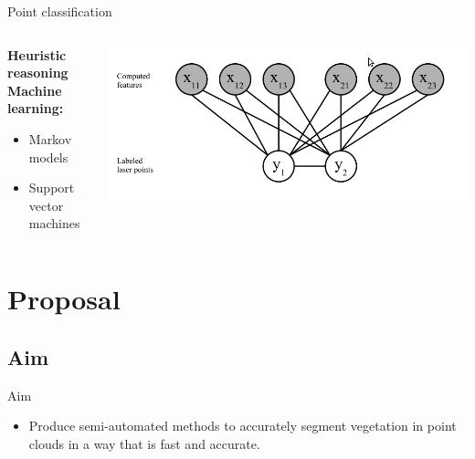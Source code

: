 \documentclass{beamer}
\begin{document}
\begin{frame}{Point classification}

\begin{columns}[T]
\begin{column}{0.5\textwidth}

\textbf{Heuristic reasoning}\\
\textbf{Machine learning:}
\begin{itemize}
\item Markov models
\item Support vector machines
\end{itemize}


\end{column}

\begin{column}{0.5\textwidth}
\includegraphics[width=1\textwidth]{pics/crf.png}

\end{column}

\end{columns}

\end{frame}

\section{Proposal}

\subsection{Aim}

\begin{frame}{Aim}
\begin{itemize}

\item
Produce semi-automated methods to accurately segment vegetation in point clouds in a way that is fast and accurate.

\end{itemize}


\end{frame}
\end{document}
